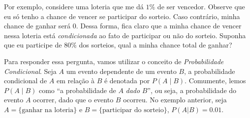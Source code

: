 \documentclass{article}
\begin{document}
            Por exemplo, considere uma loteria que me dá $1\%$ de ser vencedor. Observe que eu só tenho a chance de vencer se participar do sorteio. Caso contrário, minha chance de ganhar será $0$. Dessa forma, fica claro que a minha chance de vencer nessa loteria está \emph{condicionada} ao fato de participar ou não do sorteio. Suponha que eu participe de $80\%$ dos sorteios, qual a minha chance total de ganhar?
            
            Para responder essa pergunta, vamos utilizar o conceito de \emph{Probabilidade Condicional}. Seja $A$ um evento dependente de um evento $B$, a probabilidade condicional de $A$ em relação à $B$ é denotada por $P(A \mid B)$. Comumente, lemos $P(A \mid B)$ como ``a probabilidade de $A$ \emph{dado} $B$'', ou seja, a probabilidade do evento $A$ ocorrer, dado que o evento $B$ ocorreu. No exemplo anterior, seja $A = \{\text{ganhar na loteria}\}$ e $B = \{\text{participar do sorteio}\}$, $P(A | B) = 0.01$.
            
\end{document}

